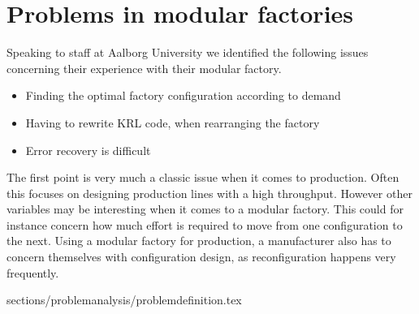 \section{Problems in modular factories}
Speaking to staff at Aalborg University we identified the following issues concerning their experience with their modular factory.

\begin{itemize}
\item Finding the optimal factory configuration according to demand
\item Having to rewrite KRL code, when rearranging the factory
\item Error recovery is difficult 
\end{itemize}

The first point is very much a classic issue when it comes to production. Often this focuses on designing production lines with a high throughput. However other variables may be interesting when it comes to a modular factory. This could for instance concern how much effort is required to move from one configuration to the next. Using a modular factory for production, a manufacturer also has to concern themselves with configuration design, as reconfiguration happens very frequently.  


 {sections/problemanalysis/problemdefinition.tex}


